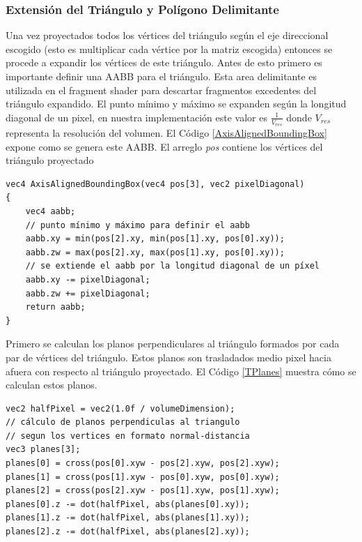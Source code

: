 \subsubsection{Extensión del Triángulo y Polígono Delimitante}
Una vez proyectados todos los vértices del triángulo según el eje direccional escogido (esto es multiplicar cada vértice por la matriz escogida) entonces se procede a expandir los vértices de este triángulo. Antes de esto primero es importante definir una \ac{AABB} para el triángulo. Esta area delimitante es utilizada en el fragment shader para descartar fragmentos excedentes del triángulo expandido. El punto mínimo y máximo se expanden según la longitud diagonal de un pixel, en nuestra implementación este valor es $\frac{1}{V_{res}}$ donde $V_{res}$ representa la resolución del volumen. El Código \ref{AxisAlignedBoundingBox} expone como se genera este \ac{AABB}.  El arreglo \emph{pos} contiene los vértices del triángulo proyectado
\\
\begin{lstlisting}[caption={Creación de un \ac{AABB} para el triángulo proyectado.}, label=AxisAlignedBoundingBox]
vec4 AxisAlignedBoundingBox(vec4 pos[3], vec2 pixelDiagonal)
{
    vec4 aabb;
    // punto mínimo y máximo para definir el aabb
    aabb.xy = min(pos[2].xy, min(pos[1].xy, pos[0].xy));
    aabb.zw = max(pos[2].xy, max(pos[1].xy, pos[0].xy));
    // se extiende el aabb por la longitud diagonal de un píxel
    aabb.xy -= pixelDiagonal;
    aabb.zw += pixelDiagonal;
    return aabb;
}
\end{lstlisting}

Primero se calculan los planos perpendiculares al triángulo formados por cada par de vértices del triángulo. Estos planos son trasladados medio pixel hacia afuera con respecto al triángulo proyectado. El Código \ref{TPlanes} muestra cómo se calculan estos planos.
\\
\begin{lstlisting}[caption={Planos por cada par de vértices del triángulo proyectado.}, label=TPlanes]
vec2 halfPixel = vec2(1.0f / volumeDimension);
// cálculo de planos perpendiculas al triangulo
// segun los vertices en formato normal-distancia
vec3 planes[3];
planes[0] = cross(pos[0].xyw - pos[2].xyw, pos[2].xyw);
planes[1] = cross(pos[1].xyw - pos[0].xyw, pos[0].xyw);
planes[2] = cross(pos[2].xyw - pos[1].xyw, pos[1].xyw);
planes[0].z -= dot(halfPixel, abs(planes[0].xy));
planes[1].z -= dot(halfPixel, abs(planes[1].xy));
planes[2].z -= dot(halfPixel, abs(planes[2].xy));
\end{lstlisting}

